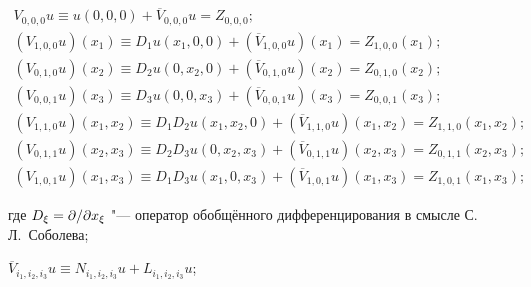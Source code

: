 \begin{equation} \label{mam:2}

\begin{array}{l}

V_{0, 0, 0}u\equiv u( 0, 0, 0) +\overline{{V}}{_{0, 0, 0}u=Z_{0, 0, 0};}

\\

( V_{1, 0, 0}u ) ( x_1) \equiv D_1 u(x_1 , 0, 0) +( \overline{{V}}_{1, 0, 0}u) ( x_1)

=Z_{1, 0, 0}( x_1) ; \\

( V_{0, 1, 0}u) ( x_2) \equiv D_2 u(

0, x_2 , 0) +( \overline{{V}}_{0, 1, 0}u) ( x_2)

=Z_{0, 1, 0}( x_2) ; \\

( V_{0, 0, 1}u) ( x_3) \equiv D_3 u(

0, 0, x_3 ) +( \overline{{V}}_{0, 0, 1}u) ( x_3)

=Z_{0, 0, 1}( x_3) ; \\

( V_{1, 1, 0}u ) ( x_1 ,x_2 )  \equiv  D_1 D_2 u (

x_1 , x_2 , 0)  + ( \overline{{V}}_{1,1,0}u) (

x_1 ,x_2 )  = Z_{1, 1, 0}( x_1 ,x_2 ) ; \\

( V_{0, 1, 1}u) ( x_2 ,x_3 )  \equiv  D_2 D_3 u(

0,x_2 ,x_3 )  + ( \overline{{V}}_{0, 1, 1}u) (

x_2 ,x_3 )  = Z_{0, 1, 1}( x_2 ,x_3 ) ; \\

( V_{1, 0, 1}u) ( x_1 ,x_3 ) \equiv D_1 D_3 u(

x_1 ,0,x_3 )  + ( \overline{{V}}_{1, 0, 1}u) (

x_1 ,x_3 )  = Z_{1, 0, 1}( x_1 ,x_3 ) ;%

\end{array}%

\end{equation}

где $D_\xi  ={\partial  \mathord{\left/{\vphantom{\partial  \partial x_\xi  }}\right.\kern-\nulldelimiterspace} \partial x_\xi  }$  "--- оператор обобщённого дифференцирования в смысле \linebreak С.\,Л.~Соболева;

$\overline{V}_{i_1 ,i_2 ,i_3 }u\equiv N_{i_1 ,i_2 ,i_3 }u+L_{i_1 ,i_2 ,i_3 }u$; %

